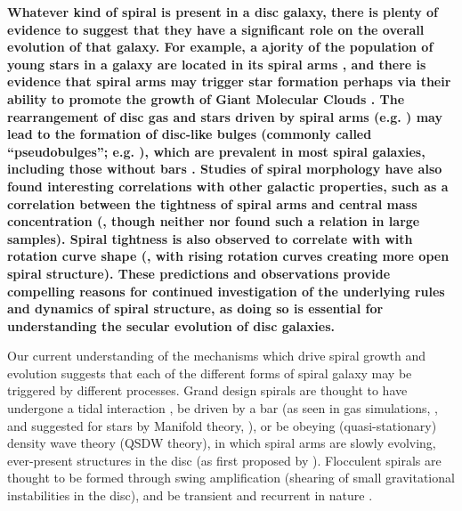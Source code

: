 \textbf{
Whatever kind of spiral is present in a disc galaxy, there is plenty of evidence to suggest that they have a significant role on the overall evolution of that galaxy. For example, a ajority of the population of young stars in a galaxy are located in its spiral arms \citep{2011EAS....51...19E}, and there is evidence that spiral arms may trigger star formation \citep{2013A&A...560A..59C} perhaps via their ability to promote the growth of Giant Molecular Clouds \citep{2014IAUS..298..221D}. The rearrangement of disc gas and stars driven by spiral arms (e.g. \citealt{2018MNRAS.476.1561D}) may lead to the formation of disc-like bulges (commonly called ``pseudobulges''; e.g. \citealt{2004ARA&A..42..603K}), which are prevalent in most spiral galaxies, including those without bars \citep{2010ApJ...716..942F}. Studies of spiral morphology have also found interesting correlations with other galactic properties, such as a correlation between the tightness of spiral arms and central mass concentration (\citealt{2019ApJ...871..194Y}, though neither \citealt{2017MNRAS.472.2263H} nor \citealt{2019MNRAS.487.1808M} found such a relation in large samples). Spiral tightness is also observed to correlate with with rotation curve shape (\citealt{2005MNRAS.359.1065S}, with rising rotation curves creating more open spiral structure). These predictions and observations provide compelling reasons for continued investigation of the underlying rules and dynamics of spiral structure, as doing so is essential for understanding the secular evolution of disc galaxies.
}

Our current understanding of the mechanisms which drive spiral growth and evolution suggests that each of the different forms of spiral galaxy may be triggered by different processes. Grand design spirals are thought to have undergone a tidal interaction \citep{2010MNRAS.403..625D,2017ApJ...834....7S}, be driven by a bar (as seen in gas simulations, \citealt{1976ApJ...209...53S,2008A&A...489..115R}, and suggested for stars by Manifold theory, \citealt{2006A&A...453...39R,2009MNRAS.394...67A,2009MNRAS.400.1706A}), or be obeying (quasi-stationary) density wave theory (QSDW theory), in which spiral arms are slowly evolving, ever-present structures in the disc (as first proposed by \citealt{1964ApJ...140..646L}). Flocculent spirals are thought to be formed through swing amplification (shearing of small gravitational instabilities in the disc), and be transient and recurrent in nature \citep{1966ApJ...146..810J}.

